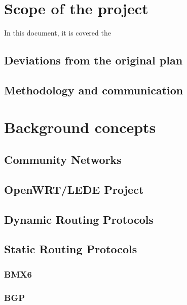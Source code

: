 \section{Scope of the project}
\label{sec:sotp}
In this document, it is covered the 

\subsection{Deviations from the original plan}



\subsection{Methodology and communication}



\section{Background concepts}
\label{sec:backc}

\subsection{Community Networks}
\label{subsec:cn}

\subsection{OpenWRT/LEDE Project}
\label{subsec:owrtlp}


\subsection{Dynamic Routing Protocols}
\label{subsec:drp}


\subsection{Static Routing Protocols}
\label{subsec:srp}


\subsubsection{BMX6}
\label{subsec:bmx}



\subsubsection{BGP}
\label{subsubsec:BADV}


